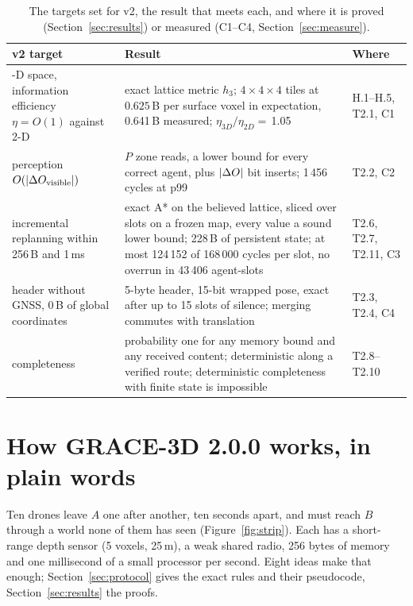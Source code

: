 \documentclass[11pt,a4paper]{article}
\DeclarePairedDelimiter\abs{\lvert}{\rvert}
\begin{document}
\begin{table}[htbp]\centering\small
\begin{tabularx}{\linewidth}{>{\raggedright\arraybackslash}p{3.6cm}L>{\raggedright\arraybackslash}p{2.2cm}}
\toprule
v2 target & Result & Where \\
-D space, information efficiency $\eta=O(1)$ against 2-D & exact lattice metric $h_3$; $4\times4\times4$ tiles at
$0.625$\,B per surface voxel in expectation, 0.641\,B measured; $\eta_{3D}/\eta_{2D}=$\,1.05 & H.1--H.5, T2.1, C1 \\
perception $O(\abs{\Delta O_{\rm visible}})$ & $P$ zone reads, a lower bound for every correct agent, plus
$\abs{\Delta O}$ bit inserts; 1\,456 cycles at p99 & T2.2, C2 \\
incremental replanning within 256\,B and 1\,ms & exact A* on the believed lattice, sliced over slots on a frozen map,
every value a sound lower bound; 228\,B of persistent state; at most 124\,152 of 168\,000 cycles per slot, no
overrun in 43\,406 agent-slots & T2.6, T2.7, T2.11, C3 \\
header without GNSS, 0\,B of global coordinates & 5-byte header, 15-bit wrapped pose, exact after up to 15 slots of
silence; merging commutes with translation & T2.3, T2.4, C4 \\
completeness & probability one for any memory bound and any received content; deterministic along a verified route;
deterministic completeness with finite state is impossible & T2.8--T2.10 \\
\bottomrule
\end{tabularx}
\caption{The targets set for v2, the result that meets each, and where it is proved (Section~\ref{sec:results}) or
measured (C1--C4, Section~\ref{sec:measure}).}
\label{tab:targets}
\end{table}

\section{How GRACE-3D 2.0.0 works, in plain words}\label{sec:idea}

Ten drones leave $A$ one after another, ten seconds apart, and must reach $B$ through a world none of them has seen
(Figure~\ref{fig:strip}). Each has a short-range depth sensor (5 voxels, 25\,m), a weak shared radio, 256 bytes of
memory and one millisecond of a small processor per second. Eight ideas make that enough; Section~\ref{sec:protocol}
gives the exact rules and their pseudocode, Section~\ref{sec:results} the proofs.
\end{document}
